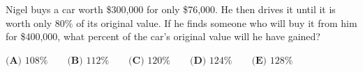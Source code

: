 Nigel buys a car worth \$300,000 for only \$76,000. He then drives it until it is worth only $80\%$ of its original value. If he finds someone who will buy it from him for \$400,000, what percent of the car's original value will he have gained?

$\textbf{(A) }108\%\qquad\textbf{(B) }112\%\qquad\textbf{(C) }120\%\qquad\textbf{(D) }124\%\qquad\textbf{(E) }128\%$
